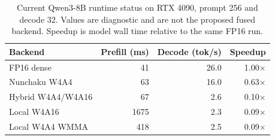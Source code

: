 \begin{table}[t]
\caption{Current Qwen3-8B runtime status on RTX 4090, prompt 256 and decode 32.
Values are diagnostic and are not the proposed fused backend. Speedup is model wall time
relative to the same FP16 run.}
\label{tab:runtime-status}
\centering
\small
\setlength{\tabcolsep}{5pt}
\begin{tabular}{lrrr}
\toprule
Backend & Prefill (ms) & Decode (tok/s) & Speedup \\
\midrule
FP16 dense & 41 & 26.0 & 1.00$\times$ \\
Nunchaku W4A4 & 63 & 16.0 & 0.63$\times$ \\
Hybrid W4A4/W4A16 & 67 & 2.6 & 0.10$\times$ \\
Local W4A16 & 1675 & 2.3 & 0.09$\times$ \\
Local W4A4 WMMA & 418 & 2.5 & 0.09$\times$ \\
\bottomrule
\end{tabular}
\end{table}
